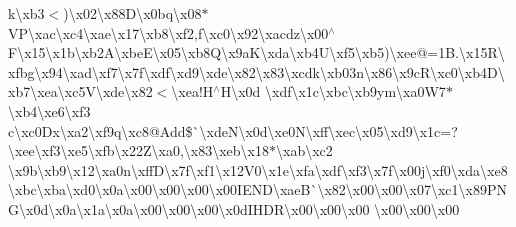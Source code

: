 k\textbackslash{}xb3$<$)\textbackslash{}x02\textbackslash{}x88\+D\textbackslash{}x0bq\textbackslash{}x08$\ast$\+V\+P\textbackslash{}xac\textbackslash{}xc4\textbackslash{}xae\textbackslash{}x17\textbackslash{}xb8\textbackslash{}xf2,f\textbackslash{}xc0\textbackslash{}x92\textbackslash{}xacdz\textbackslash{}x00$^\wedge$\+F\textbackslash{}x15\textbackslash{}x1b\textbackslash{}xb2\+A\textbackslash{}xbe\+E\textbackslash{}x05\textbackslash{}xb8\+Q\textbackslash{}x9a\+K\textbackslash{}xda\textbackslash{}xb4\+U\textbackslash{}xf5\textbackslash{}xb5)\textbackslash{}xee@=1\+B.\textbackslash{}x15\+R\textbackslash{}xfbg\textbackslash{}x94\textbackslash{}xad\textbackslash{}xf7\textbackslash{}x7f\textbackslash{}xdf\textbackslash{}xd9\textbackslash{}xde\textbackslash{}x82\textbackslash{}x83\textbackslash{}xcdk\textbackslash{}xb03n\textbackslash{}x86\textbackslash{}x9c\+R\textbackslash{}xc0\textbackslash{}xb4\+D\textbackslash{}xb7\textbackslash{}xea\textbackslash{}xc5\+V\textbackslash{}xde\textbackslash{}x82$<$\textbackslash{}xea!\+H$^\wedge$\+H\textbackslash{}x0d \textbackslash{}xdf\textbackslash{}x1c\textbackslash{}xbc\textbackslash{}xb9ym\textbackslash{}xa0\+W7$\ast$\textbackslash{}xb4\textbackslash{}xe6\textbackslash{}xf3 c\textbackslash{}xc0\+Dx\textbackslash{}xa2\textbackslash{}xf9q\textbackslash{}xc8@\+Add\$\`{}\textbackslash{}xde\+N\textbackslash{}x0d\textbackslash{}xe0\+N\textbackslash{}xff\textbackslash{}xec\textbackslash{}x05\textbackslash{}xd9\textbackslash{}x1c=?\textbackslash{}xee\textbackslash{}xf3\textbackslash{}xe5\textbackslash{}xfb\textbackslash{}x22\+Z\textbackslash{}xa0,\textbackslash{}x83\textbackslash{}xeb\textbackslash{}x18$\ast$\textbackslash{}xab\textbackslash{}xc2 \textbackslash{}x9b\textbackslash{}xb9\textbackslash{}x12\textbackslash{}xa0n\textbackslash{}xff\+D\textbackslash{}x7f\textbackslash{}xf1\textbackslash{}x12\+V0\textbackslash{}x1e\textbackslash{}xfa\textbackslash{}xdf\textbackslash{}xf3\textbackslash{}x7f\textbackslash{}x00j\textbackslash{}xf0\textbackslash{}xda\textbackslash{}xe8\textbackslash{}xbc\textbackslash{}xba\textbackslash{}xd0\textbackslash{}x0a\textbackslash{}x00\textbackslash{}x00\textbackslash{}x00\textbackslash{}x00\+I\+E\+N\+D\textbackslash{}xae\+B\`{}\textbackslash{}x82\textbackslash{}x00\textbackslash{}x00\textbackslash{}x07\textbackslash{}xc1\textbackslash{}x89\+P\+N\+G\textbackslash{}x0d\textbackslash{}x0a\textbackslash{}x1a\textbackslash{}x0a\textbackslash{}x00\textbackslash{}x00\textbackslash{}x00\textbackslash{}x0d\+I\+H\+D\+R\textbackslash{}x00\textbackslash{}x00\textbackslash{}x00 \textbackslash{}x00\textbackslash{}x00\textbackslash{}x00 